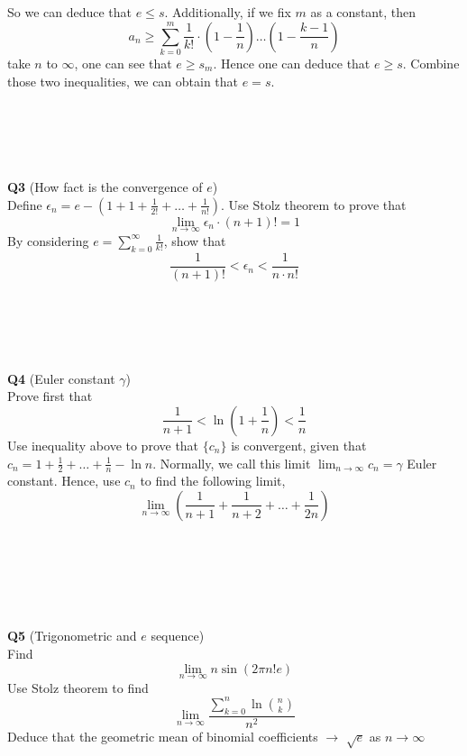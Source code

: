 \documentclass{article}
\newcommand{\tb}[1]{\textbf{#1}}
\begin{document}
So we can deduce that $e \leq s$.
Additionally, if we fix $m$ as a constant, then 
$$
a_n \geq \sum_{k=0}^{m} \frac{1}{k!} \cdot \left( 1 - \frac{1}{n}\right) \dots \left(1 - \frac{k-1}{n}\right)
$$
take $n$ to $\infty$, one can see that $e \geq s_m$. Hence one can deduce that $e\geq s$. Combine those two inequalities, we can obtain that
$e = s$.\\
\\
\\
\\
\\
\\
\tb{Q3} (How fact is the convergence of $e$)\\
Define $\epsilon_n = e - (1 + 1+ \frac{1}{2!} + \dots + \frac{1}{n!})$. Use Stolz theorem to prove that 
$$
\lim_{n \to \infty} \epsilon_n \cdot (n+1)! = 1
$$
By considering $e = \sum_{k = 0}^{\infty} \frac{1}{k!}$, show that $$\frac{1}{(n+1)!}< \epsilon_n < \frac{1}{n\cdot n!}$$\\
\\
\\
\\
\\
\tb{Q4} (Euler constant $\gamma$)\\
Prove first that 
$$
\frac{1}{n+1} < \ln{\left(1 + \frac{1}{n}\right)} < \frac{1}{n}
$$
Use inequality above to prove that $\{c_n\}$ is convergent, given that $c_n = 1 + \frac{1}{2} + \dots + \frac{1}{n} - \ln n $. 
Normally, we call this limit $\lim_{n \to \infty} c_n = \gamma$ Euler constant. Hence, use $c_n$ to find the following limit, 
$$
\lim_{n \to \infty} \left( \frac{1}{n+1} + \frac{1}{n+2} + \dots + \frac{1}{2n}\right)
$$\\
\\
\\
\\
\\
\\
\tb{Q5} (Trigonometric and $e$ sequence)\\
Find 
$$
\lim_{n \to \infty} n \sin(2\pi n! e)
$$
Use Stolz theorem to find 
$$
\lim_{n \to \infty} \frac{\sum_{k=0}^{n}\ln \binom{n}{k}}{n^2}
$$
Deduce that the geometric mean of binomial coefficients $\rightarrow$ $\sqrt{e}$ as $n\rightarrow \infty$
\newpage 
\end{document}
